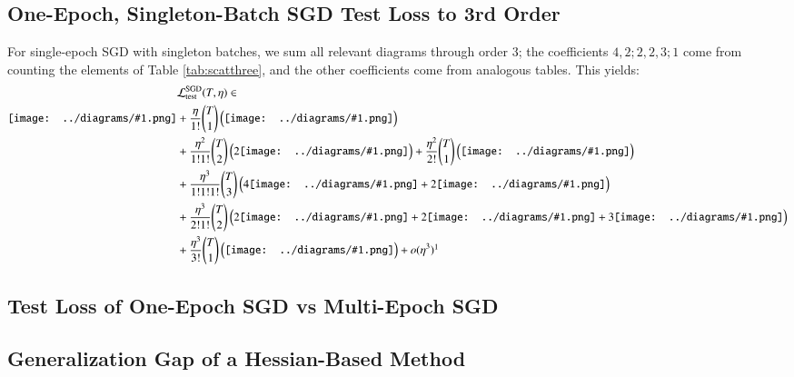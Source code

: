 \documentclass{article}
\newcommand{\wrap}[1]{\left( #1 \right)}
\newcommand{\sdia}[1]{\begin{gathered}\texttt{[image: ../diagrams/\#1.png]}\end{gathered}}
\begin{document}
    \subsection*{One-Epoch, Singleton-Batch SGD Test Loss to 3rd Order}
        For single-epoch SGD with singleton batches, we sum all relevant diagrams
        through order $3$; the coefficients $4, 2; 2, 2, 3; 1$ come from counting
        the elements of Table \ref{tab:scatthree}, and the other coefficients come
        from analogous tables.  This yields:
        \begin{align*}
                &\mathcal{L}^{\text{SGD}}_\text{test}(T, \eta) \in                   
            \\ 
                   \sdia{(0)()}
                &+ \frac{\eta}{1!}   {T \choose 1} \wrap{\sdia{(0-1)(01)}}
            \\
                &+ \frac{\eta^2}{1!1!} {T \choose 2} \wrap{2 \sdia{(0-1-2)(01-12)}} 
                 + \frac{\eta^2}{2!} {T \choose 1} \wrap{\sdia{(01-2)(02-12)}}
            \\
                &+ \frac{\eta^3}{1!1!1!} {T \choose 3} \wrap{
                           4 \sdia{(0-1-2-3)(01-12-23)}+
                           2 \sdia{(0-1-2-3)(03-13-23)}
                       }
            \\
                &+ \frac{\eta^3}{2!1!} {T \choose 2} \wrap{
                           2         \sdia{(01-2-3)(03-12-23)}+
                           2    \sdia{(0-12-3)(02-13-23)}+
                           3     \sdia{(01-2-3)(02-12-23)}
                       }
            \\
                &+ \frac{\eta^3}{3!} {T \choose 1} \wrap{\sdia{(012-3)(03-13-23)}}
                + o(\eta^3)\footnotemark
        \end{align*}

    \subsection*{Test Loss of One-Epoch SGD vs Multi-Epoch SGD}

    \subsection*{Generalization Gap of a Hessian-Based Method}
\end{document}
